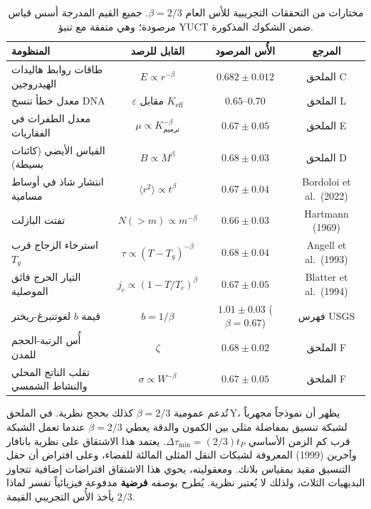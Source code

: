 \documentclass[12pt,a4paper]{article}
\begin{document}
	\begin{table}[H]
		\centering
		\caption{مختارات من التحققات التجريبية للأُس العام \(\beta = 2/3\). جميع القيم المدرجة أُسس قياس مرصودة؛ وهي متفقة مع تنبؤ YUCT ضمن الشكوك المذكورة.}
		\label{tab:beta-evidence}
		\small
		\begin{tabular}{l c c c}
			\toprule
			\textbf{المنظومة} & \textbf{القابل للرصد} & \textbf{الأُس المرصود} & \textbf{المرجع} \\
			\midrule
			طاقات روابط هاليدات الهيدروجين & \(E \propto r^{-\beta}\) & \(0.682 \pm 0.012\) & الملحق C \\
			معدل خطأ تنسخ DNA & \(\varepsilon\) مقابل \(K_{\mathrm{eff}}\) & \(0.65\text{--}0.70\) & الملحق L \\
			معدل الطفرات في الفقاريات & \(\mu \propto K_{\text{ترميم}}^{-\beta}\) & \(0.67 \pm 0.05\) & الملحق E \\
			القياس الأيضي (كائنات بسيطة) & \(B \propto M^{\beta}\) & \(0.68 \pm 0.03\) & الملحق D \\
			انتشار شاذ في أوساط مسامية & \(\langle r^2 \rangle \propto t^{\beta}\) & \(0.67 \pm 0.04\) & Bordoloi et al.\ (2022) \\
			تفتت البازلت & \(N(>m) \propto m^{-\beta}\) & \(0.66 \pm 0.03\) & Hartmann (1969) \\
			استرخاء الزجاج قرب \(T_g\) & \(\tau \propto (T-T_g)^{-\beta}\) & \(0.68 \pm 0.04\) & Angell et al.\ (1993) \\
			التيار الحرج فائق الموصلية & \(j_c \propto (1-T/T_c)^{\beta}\) & \(0.67 \pm 0.05\) & Blatter et al.\ (1994) \\
			قيمة \(b\) لغوتنبرغ-ريختر & \(b = 1/\beta\) & \(1.01 \pm 0.03\) (\(\beta=0.67\)) & فهرس USGS \\
			أُس الرتبة-الحجم للمدن & \(\zeta\) & \(0.68 \pm 0.02\) & الملحق F \\
			تقلب الناتج المحلي والنشاط الشمسي & \(\sigma \propto W^{-\beta}\) & \(0.67 \pm 0.05\) & الملحق F \\
			\bottomrule
		\end{tabular}
	\end{table}
	
	تُدعم عمومية \(\beta = 2/3\) كذلك بحجج نظرية. في الملحق Y، يظهر أن نموذجاً مجهرياً لشبكة تنسيق بمفاضلة مثلى بين الكمون والدقة يعطي \(\beta = 2/3\) عندما تعمل الشبكة قرب كم الزمن الأساسي \(\Delta\tau_{\min} = (2/3) t_P\). يعتمد هذا الاشتقاق على نظرية بانافار وآخرين (1999) المعروفة لشبكات النقل المثلى المالئة للفضاء، وعلى افتراض أن حقل التنسيق مقيد بمقياس بلانك. ومعقوليته، يحوي هذا الاشتقاق افتراضات إضافية تتجاوز البديهيات الثلاث، ولذلك لا يُعتبر نظرية. يُطرح بوصفه \textbf{فرضية} مدفوعة فيزيائياً تفسر لماذا يأخذ الأُس التجريبي القيمة \(2/3\).
	
\end{document}
